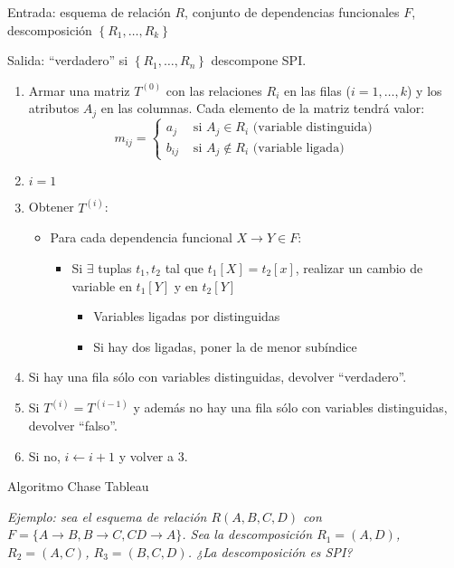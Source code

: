 \documentclass[a4paper, twoside]{article}
\begin{document}
\begin{algorithm}[H]
	Entrada: esquema de relación $R$, conjunto de dependencias funcionales $F$, descomposición $\left\{ R_{1},\ldots,R_{k}\right\}$

	Salida: ``verdadero'' si $\left\{ R_{1},\ldots,R_{n}\right\} $ descompone SPI.
	\begin{enumerate}
		\item Armar una matriz $T^{(0)}$ con las relaciones $R_{i}$ en las filas ($i=1,\ldots,k$) y los atributos $A_{j}$ en las columnas. Cada elemento de la matriz tendrá valor:
\[
	m_{ij}=
	\begin{cases}
		a_{j} & \text{ si }A_{j}\in R_{i}\text{ (variable distinguida)}\\
		b_{ij} & \text{ si }A_{j}\not\in R_{i}\text{ (variable ligada)}
	\end{cases}
\]

		\item $i=1$

		\item Obtener $T^{(i)}$:
		\begin{itemize}
			\item Para cada dependencia funcional $X\to Y\in F$:
			\begin{itemize}
				\item Si $\exists$ tuplas $t_{1},t_{2}$ tal que $t_{1}[X]=t_{2}[x]$, realizar un cambio de variable en $t_{1}[Y]$ y en $t_{2}[Y]$
				\begin{itemize}
					\item Variables ligadas por distinguidas
					\item Si hay dos ligadas, poner la de menor subíndice
				\end{itemize}
			\end{itemize}
		\end{itemize}

		\item Si hay una fila sólo con variables distinguidas, devolver ``verdadero''.

		\item Si $T^{(i)}=T^{(i-1)}$ y además no hay una fila sólo con variables distinguidas, devolver ``falso''.
		
		\item Si no, $i\leftarrow i+1$ y volver a 3.
	\end{enumerate}
	\caption{Algoritmo Chase Tableau}
\end{algorithm}

\emph{Ejemplo: sea el esquema de relación $R(A,B,C,D)$ con $F=\{A\to B,B\to C,CD\to A\}$. Sea la descomposición $R_{1}=(A,D)$, $R_{2}=(A,C)$, $R_{3}=(B,C,D)$. ¿La descomposición es SPI?}
\end{document}
